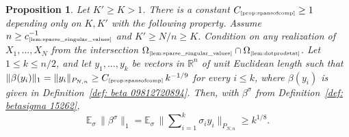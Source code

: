 \documentclass[11pt]{amsart}
\newtheorem{proposition}[theorem]{Proposition}
\theoremstyle{definition}
\theoremstyle{plain}
\newcommand{\R}{\mathbb{R}}
\def\R{{\mathbb R}}
\def\Exp{{\mathbb E}}
\begin{document}
\begin{proposition}\label{prop:spansofcomp}
Let $K'\geq K>1$.
There is a constant $C_{\text{\tiny\ref{prop:spansofcomp}}}\geq 1$
depending only on $K,K'$ with the following property.
Assume $n\geq c_{\text{\tiny\ref{lem:sparse_singular_values}}}^{-1}$
and $K'\geq N/n\geq K$.
Condition on any realization of $X_1,\dots,X_N$
from the intersection
$\Omega_{\text{\tiny\ref{lem:sparse_singular_values}}}
\cap \Omega_{\text{\tiny\ref{lem:dotprodstat}}}$.
Let $1\leq k\leq n/2$, and let $y_1,\dots,y_k$
be vectors in $\R^n$ of unit Euclidean length
such that $\|\beta(y_i)\|_{1}=\|y_i\|_{P_{N,n}}\geq
C_{\text{\tiny\ref{prop:spansofcomp}}}\,k^{-1/9}$
for every $i\leq k$, where $\beta(y_i)$ is given in Definition~\ref{def: beta 09812720894}. Then,
with $\beta^\sigma$ from Definition~\ref{def: betasigma 15262},
$$
\Exp_\sigma\,\|\beta^\sigma\|_1
=\Exp_\sigma\,\Big\|
\sum\nolimits_{i=1}^k \sigma_i y_i
\Big\|_{P_{N,n}}\geq k^{1/8}.
$$
\end{proposition}
\end{document}
